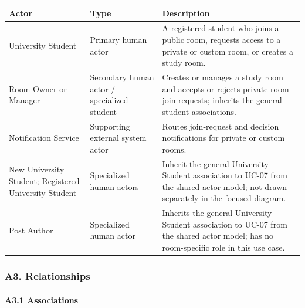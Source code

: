 \documentclass[12pt]{article}
\renewcommand{\baselinestretch}{1.5}
\begin{document}
\begingroup
\small
\renewcommand{\baselinestretch}{1.0}\selectfont
\renewcommand{\arraystretch}{1.15}
\setlength{\tabcolsep}{6pt}
\begin{longtable}{|>{\raggedright\arraybackslash}p{}|>{\raggedright\arraybackslash}p{}|>{\raggedright\arraybackslash}p{}|}
\hline
\textbf{Actor} & \textbf{Type} & \textbf{Description} \\ \hline
\endhead
University Student & Primary human actor & A registered student who joins a public room, requests access to a private or custom room, or creates a study room. \\ \hline
Room Owner or Manager & Secondary human actor / specialized student & Creates or manages a study room and accepts or rejects private-room join requests; inherits the general student associations. \\ \hline
Notification Service & Supporting external system actor & Routes join-request and decision notifications for private or custom rooms. \\ \hline
New University Student; Registered University Student & Specialized human actors & Inherit the general University Student association to UC-07 from the shared actor model; not drawn separately in the focused diagram. \\ \hline
Post Author & Specialized human actor & Inherits the general University Student association to UC-07 from the shared actor model; has no room-specific role in this use case. \\ \hline
\end{longtable}
\endgroup
\par\medskip

\hypertarget{sec:a3-relationships}{}
\subsubsection*{A3. Relationships}
\par\medskip

\hypertarget{sec:a3-1-associations}{}
\paragraph*{A3.1 Associations}
\par\medskip
\end{document}
